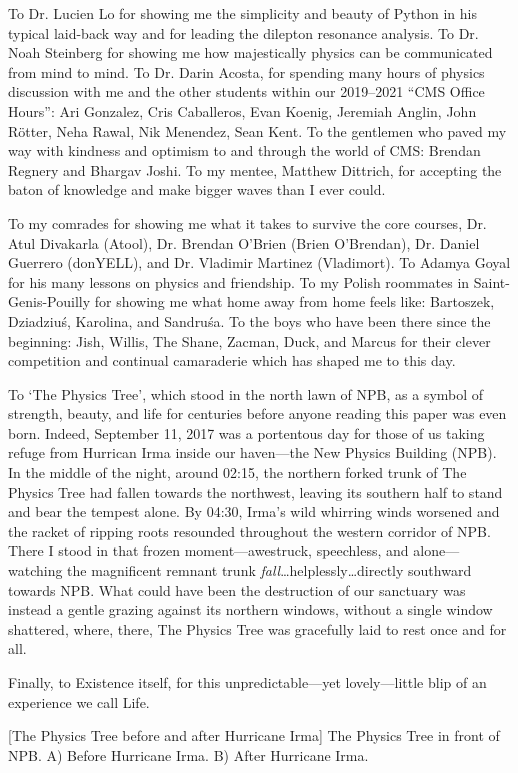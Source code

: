 To Dr. Lucien Lo for showing me the simplicity and beauty of Python in his typical laid-back way and for leading the dilepton resonance analysis.
To Dr. Noah Steinberg for showing me how majestically physics can be communicated from mind to mind.
To Dr. Darin Acosta, for spending many hours of physics discussion with me and the other students within our 2019--2021 ``CMS Office Hours'':
Ari Gonzalez, Cris Caballeros, Evan Koenig, Jeremiah Anglin, John Rötter, Neha Rawal, Nik Menendez, Sean Kent.
To the gentlemen who paved my way with kindness and optimism to and through the world of CMS: Brendan Regnery and Bhargav Joshi.
To my mentee, Matthew Dittrich, for accepting the baton of knowledge and make bigger waves than I ever could.

To my comrades for showing me what it takes to survive the core courses, Dr. Atul Divakarla (Atool), Dr. Brendan O'Brien (Brien O'Brendan), Dr. Daniel Guerrero (donYELL), and Dr. Vladimir Martinez (Vladimort).
To Adamya Goyal for his many lessons on physics and friendship.
To my Polish roommates in Saint-Genis-Pouilly for showing me what home away from home feels like: Bartoszek, Dziadziuś, Karolina, and Sandruśa.
To the boys who have been there since the beginning: Jish, Willis, The Shane, Zacman, Duck, and Marcus for their clever competition and continual camaraderie which has shaped me to this day.

To `The Physics Tree', which stood in the north lawn of NPB, as a symbol of strength, beauty, and life for centuries before anyone reading this paper was even born.
Indeed, September 11, 2017 was a portentous day for those of us taking refuge from Hurrican Irma inside our haven---the New Physics Building (NPB).
In the middle of the night, around 02:15, the northern forked trunk of The Physics Tree had fallen towards the northwest, leaving its southern half to stand and bear the tempest alone.
By 04:30, Irma's wild whirring winds worsened and the racket of ripping roots resounded throughout the western corridor of NPB.
There I stood in that frozen moment---awestruck, speechless, and alone---watching the magnificent remnant trunk \emph{fall}\ldots helplessly\ldots directly southward towards NPB.
What could have been the destruction of our sanctuary was instead a gentle grazing against its northern windows, without a single window shattered, where, there, The Physics Tree was gracefully laid to rest once and for all.

Finally, to Existence itself, for this unpredictable---yet lovely---little blip of an experience we call Life.
\begin{multiFigure}
    \centering
        [The Physics Tree before and after Hurricane Irma]
        {The Physics Tree in front of NPB.
        \;A) Before Hurricane Irma.
        \;B) After Hurricane Irma.
        }
\end{multiFigure}
